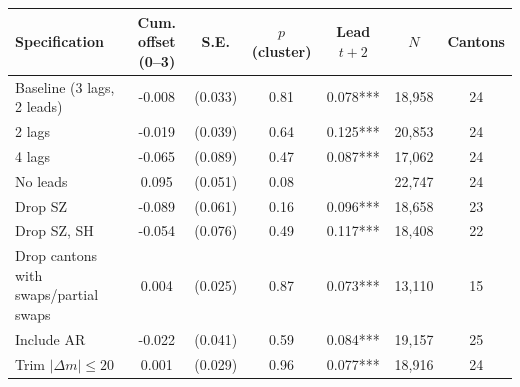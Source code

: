 \begin{tabular}{lcccccc}
\toprule
Specification & Cum. offset (0--3) & S.E. & $p$ (cluster) & Lead $t{+}2$ & $N$ & Cantons \\
\midrule
Baseline (3 lags, 2 leads) & -0.008 & (0.033) & 0.81 & 0.078*** & 18,958 & 24 \\
2 lags & -0.019 & (0.039) & 0.64 & 0.125*** & 20,853 & 24 \\
4 lags & -0.065 & (0.089) & 0.47 & 0.087*** & 17,062 & 24 \\
No leads & 0.095 & (0.051) & 0.08 &  & 22,747 & 24 \\
Drop SZ & -0.089 & (0.061) & 0.16 & 0.096*** & 18,658 & 23 \\
Drop SZ, SH & -0.054 & (0.076) & 0.49 & 0.117*** & 18,408 & 22 \\
Drop cantons with swaps/partial swaps & 0.004 & (0.025) & 0.87 & 0.073*** & 13,110 & 15 \\
Include AR & -0.022 & (0.041) & 0.59 & 0.084*** & 19,157 & 25 \\
Trim $|\Delta m|\le 20$ & 0.001 & (0.029) & 0.96 & 0.077*** & 18,916 & 24 \\
\bottomrule
\end{tabular}